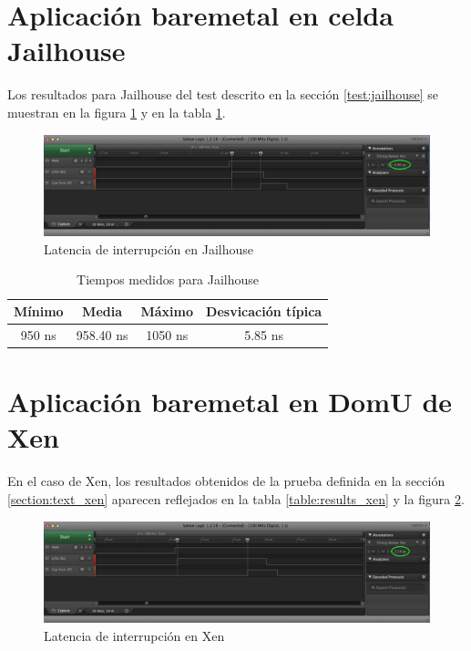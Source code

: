 \section{Aplicación baremetal en celda Jailhouse}

Los resultados para Jailhouse del test descrito en la sección \ref{test:jailhouse} se muestran en la figura \ref{fig:resultados:jailhouse} y en la tabla \ref{table:results_jailhouse}.\\

\begin{figure}[!h]
  \centering
  \includegraphics[width=1.0\textwidth]{recursos/jailhouse_1_saleae.png}
  \caption{Latencia de interrupción en Jailhouse}
  \label{fig:resultados:jailhouse}
\end{figure}

\begin{table}[!ht]
  \centering
	\begin{tabular}{ |c|c|c|c| }
		\hline
    Mínimo          & Media      & Máximo  & Desvicación típica  \\
    \hline
    950 ns         & 958.40 ns      & 1050 ns    & 5.85 ns	   \\
    \hline
	\end{tabular}
	\caption{Tiempos medidos para Jailhouse}
  \label{table:results_jailhouse}
\end{table}

\section{Aplicación baremetal en DomU de Xen}

En el caso de Xen, los resultados obtenidos de la prueba definida en la sección \ref{section:text_xen} aparecen reflejados en la tabla \ref{table:results_xen} y la figura \ref{fig:resultados:xen}.\\

\begin{figure}[!h]
  \centering
  \includegraphics[width=1.0\textwidth]{recursos/xen_1_saleae.png}
  \caption{Latencia de interrupción en Xen}
  \label{fig:resultados:xen}
\end{figure}

